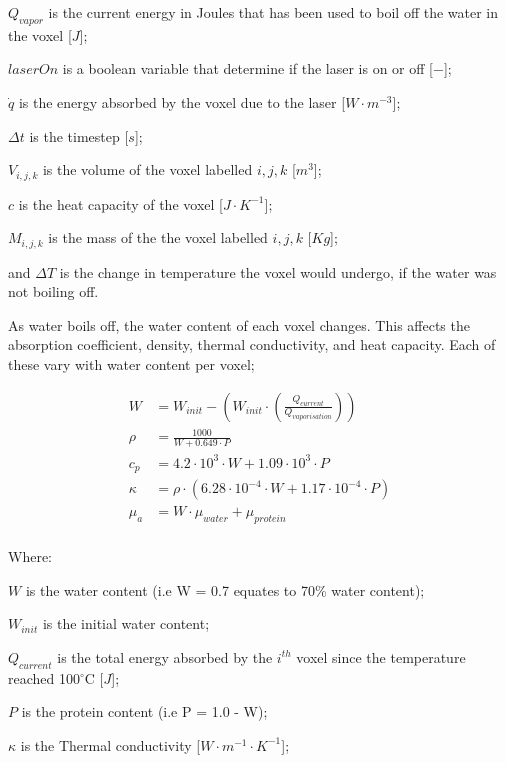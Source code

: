 	\indent $Q_{vapor}$ is the current energy in Joules that has been used to boil off the water in the voxel [$J$];
	
	\indent $laserOn$ is a boolean variable that determine if the laser is on or off [$-$];
	
	\indent $\dot{q}$ is the energy absorbed by the voxel due to the laser [$W\cdot m^{-3}$];
	
	\indent $\Delta t$ is the timestep [$s$];
	
	\indent $V_{i,j,k}$ is the volume of the voxel labelled $i,j,k$ [$m^3$];
	
	\indent $c$ is the heat capacity of the voxel [$J\cdot K^{-1}$];
	
	\indent $M_{i,j,k}$ is the mass of the the voxel labelled $i,j,k$ [$Kg$];
	
	\indent and $\Delta T$ is the change in temperature the voxel would undergo, if the water was not boiling off.

	\medskip
	
As water boils off, the water content of each voxel changes. This affects the absorption coefficient, density, thermal conductivity, and heat capacity. Each of these vary with water content per voxel\cite{loiola2018thermal};

\begin{align}
W &= W_{init} - \left(W_{init} \cdot \left(\tfrac{Q_{current}}{Q_{vaporisation}}\right)\right) \\
\rho &= \frac{1000}{W + 0.649\cdot P} \\
c_p &= 4.2\cdot 10^{3}\cdot W + 1.09\cdot 10^{3}\cdot P \\
\kappa &= \rho \cdot (6.28\cdot 10^{-4}\cdot W + 1.17\cdot 10^{-4} \cdot P)\\
\mu_a &= W \cdot \mu_{water} + \mu_{protein}\\
\end{align}

\noindent Where:

\indent $W$ is the water content (i.e W = 0.7 equates to 70\% water content);

\indent $W_{init}$ is the initial water content;

\indent $Q_{current}$ is the total energy absorbed by the $i^{th}$ voxel since the temperature reached 100$^{\circ}$C [$J$];

\indent $P$ is the protein content (i.e P = 1.0 - W);

\indent $\kappa$ is the Thermal conductivity [$W\cdot m^{-1}\cdot K^{-1}$];

